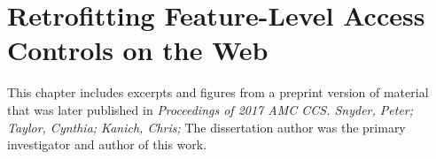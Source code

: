 \chapter{Retrofitting Feature-Level Access Controls on the Web}
\label{current-web}

This chapter includes excerpts and figures from a preprint version of material
that was later published in \textit{Proceedings of 2017 AMC CCS. Snyder, Peter;
Taylor, Cynthia; Kanich, Chris;} The dissertation author was the primary
investigator and author of this work.





